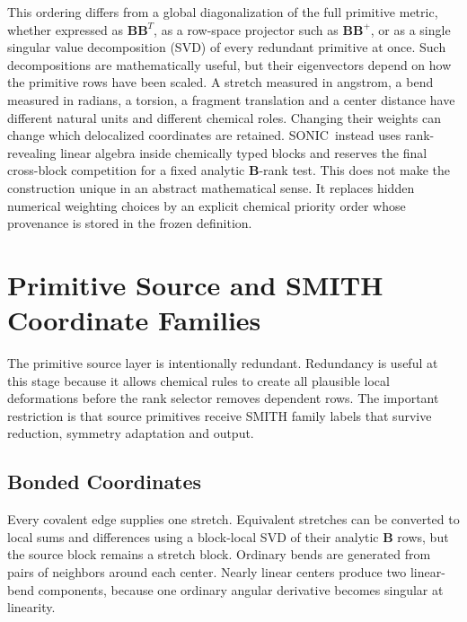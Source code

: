 \documentclass[journal=jctcce,manuscript=article,layout=traditional]{achemso}
\newcommand{\SONIC}{SONIC}
\newcommand{\Bmat}{\mathbf{B}}
\theoremstyle{definition}
\begin{document}
This ordering differs from a global diagonalization of the full primitive
metric, whether expressed as \( \Bmat \Bmat^T \), as a row-space projector such
as \( \Bmat \Bmat^+ \), or as a single singular value decomposition (SVD) of every redundant primitive at
once.  Such decompositions are mathematically useful, but their eigenvectors
depend on how the primitive rows have been scaled.  A stretch measured in
angstrom, a bend measured in radians, a torsion, a fragment translation and a
center distance have different natural units and different chemical roles.
Changing their weights can change which delocalized coordinates are retained.
\SONIC\ instead uses rank-revealing linear algebra inside chemically typed
blocks and reserves the final cross-block competition for a fixed
analytic \(\Bmat\)-rank test.  This does not make the construction unique in an
abstract mathematical sense.  It replaces hidden numerical weighting choices by
an explicit chemical priority order whose provenance is stored in the frozen
definition.

\section{Primitive Source and SMITH Coordinate Families}

The primitive source layer is intentionally redundant.  Redundancy is useful at this
stage because it allows chemical rules to create all plausible local
deformations before the rank selector removes dependent rows.  The important
restriction is that source primitives receive SMITH family labels that survive
reduction, symmetry adaptation and output.

\subsection{Bonded Coordinates}

Every covalent edge supplies one stretch. Equivalent stretches can be converted
to local sums and differences using a block-local SVD of their analytic
\(\Bmat\) rows, but the source block remains a stretch block.  Ordinary bends
are generated from pairs of neighbors around each center.  Nearly linear
centers produce two linear-bend components, because one ordinary angular
derivative becomes singular at linearity.
\end{document}
